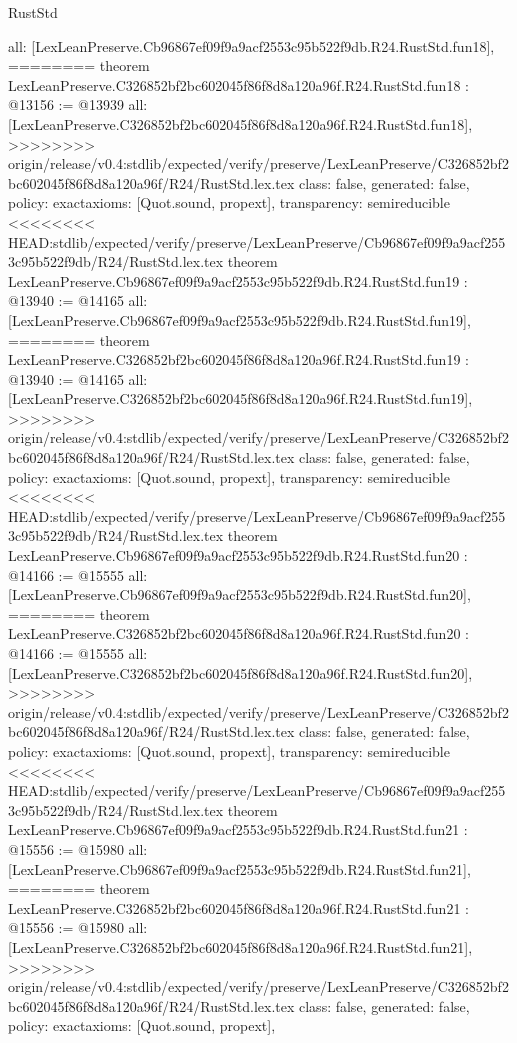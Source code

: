 \begin{lexlean}{RustStd}
\begin{coremodule}
{\begin{coremodule}
{{{{{{{{{{{{{{{{{{{{{  all: [LexLeanPreserve.Cb96867ef09f9a9acf2553c95b522f9db.R24.RustStd.fun18],
========
theorem LexLeanPreserve.C326852bf2bc602045f86f8d8a120a96f.R24.RustStd.fun18 : @13156 := @13939 {
  all: [LexLeanPreserve.C326852bf2bc602045f86f8d8a120a96f.R24.RustStd.fun18],
>>>>>>>> origin/release/v0.4:stdlib/expected/verify/preserve/LexLeanPreserve/C326852bf2bc602045f86f8d8a120a96f/R24/RustStd.lex.tex
  class: false,
  generated: false,
  policy: exact{axioms: [Quot.sound, propext]},
  transparency: semireducible
}
<<<<<<<< HEAD:stdlib/expected/verify/preserve/LexLeanPreserve/Cb96867ef09f9a9acf2553c95b522f9db/R24/RustStd.lex.tex
theorem LexLeanPreserve.Cb96867ef09f9a9acf2553c95b522f9db.R24.RustStd.fun19 : @13940 := @14165 {
  all: [LexLeanPreserve.Cb96867ef09f9a9acf2553c95b522f9db.R24.RustStd.fun19],
========
theorem LexLeanPreserve.C326852bf2bc602045f86f8d8a120a96f.R24.RustStd.fun19 : @13940 := @14165 {
  all: [LexLeanPreserve.C326852bf2bc602045f86f8d8a120a96f.R24.RustStd.fun19],
>>>>>>>> origin/release/v0.4:stdlib/expected/verify/preserve/LexLeanPreserve/C326852bf2bc602045f86f8d8a120a96f/R24/RustStd.lex.tex
  class: false,
  generated: false,
  policy: exact{axioms: [Quot.sound, propext]},
  transparency: semireducible
}
<<<<<<<< HEAD:stdlib/expected/verify/preserve/LexLeanPreserve/Cb96867ef09f9a9acf2553c95b522f9db/R24/RustStd.lex.tex
theorem LexLeanPreserve.Cb96867ef09f9a9acf2553c95b522f9db.R24.RustStd.fun20 : @14166 := @15555 {
  all: [LexLeanPreserve.Cb96867ef09f9a9acf2553c95b522f9db.R24.RustStd.fun20],
========
theorem LexLeanPreserve.C326852bf2bc602045f86f8d8a120a96f.R24.RustStd.fun20 : @14166 := @15555 {
  all: [LexLeanPreserve.C326852bf2bc602045f86f8d8a120a96f.R24.RustStd.fun20],
>>>>>>>> origin/release/v0.4:stdlib/expected/verify/preserve/LexLeanPreserve/C326852bf2bc602045f86f8d8a120a96f/R24/RustStd.lex.tex
  class: false,
  generated: false,
  policy: exact{axioms: [Quot.sound, propext]},
  transparency: semireducible
}
<<<<<<<< HEAD:stdlib/expected/verify/preserve/LexLeanPreserve/Cb96867ef09f9a9acf2553c95b522f9db/R24/RustStd.lex.tex
theorem LexLeanPreserve.Cb96867ef09f9a9acf2553c95b522f9db.R24.RustStd.fun21 : @15556 := @15980 {
  all: [LexLeanPreserve.Cb96867ef09f9a9acf2553c95b522f9db.R24.RustStd.fun21],
========
theorem LexLeanPreserve.C326852bf2bc602045f86f8d8a120a96f.R24.RustStd.fun21 : @15556 := @15980 {
  all: [LexLeanPreserve.C326852bf2bc602045f86f8d8a120a96f.R24.RustStd.fun21],
>>>>>>>> origin/release/v0.4:stdlib/expected/verify/preserve/LexLeanPreserve/C326852bf2bc602045f86f8d8a120a96f/R24/RustStd.lex.tex
  class: false,
  generated: false,
  policy: exact{axioms: [Quot.sound, propext]},
}}}}}}}}}}}}}}}}}}}}}}}}}
\end{coremodule}}
\end{coremodule}
\end{lexlean}
